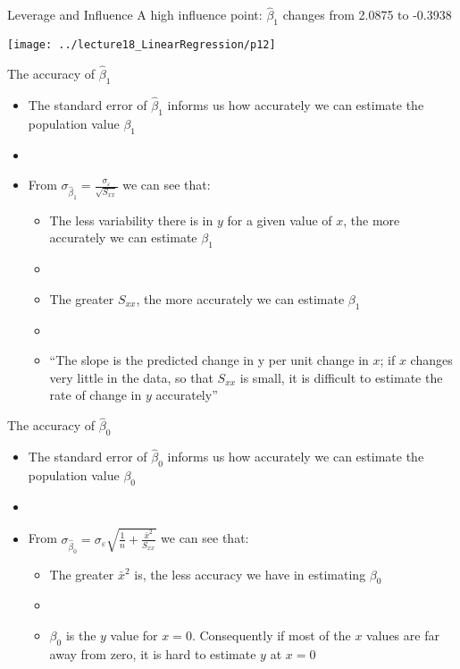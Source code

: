 \documentclass[xcolor=dvipsnames]{beamer}
\begin{document}
\begin{frame}{Leverage and Influence}
A high influence point: $\hat{\beta}_1$ changes from 2.0875 to -0.3938
\begin{center}
	\texttt{[image: ../lecture18\_LinearRegression/p12]}
\end{center}
\end{frame}

\begin{frame}{The accuracy of $\hat{\beta}_1$}
	\begin{itemize}
		\item The standard error of $\hat{\beta}_1$ informs us how accurately we can estimate the population value $\beta_1$
		\item[]
		\item From $\sigma_{\hat{\beta}_1} = \frac{\sigma_{\varepsilon}}{\sqrt{S_{xx}}}$ we can see that:
		\begin{itemize}
			\item The less variability there is in $y$ for a given value of $x$, the more accurately we can estimate $\beta_1$
			\item[]
			\item The greater $S_{xx}$, the more accurately we can estimate $\beta_1$
			\item[]
			\item ``The slope is the predicted change in y per unit change in $x$; if $x$ changes very little in the data, so that $S_{xx}$ is small, it is difficult to estimate the rate of change in $y$ accurately''
		\end{itemize}
	\end{itemize}
\end{frame}

\begin{frame}{The accuracy of $\hat{\beta}_0$}
	\begin{itemize}
		\item The standard error of $\hat{\beta}_0$ informs us how accurately we can estimate the population value $\beta_0$
		\item[]
		\item From $\sigma_{\hat{\beta}_0} = \sigma_{\varepsilon} \sqrt{\frac{1}{n}+\frac{\bar{x}^2}{S_{xx}}}$ we can see that:
		\begin{itemize}
			\item The greater $\bar{x}^2$ is, the less accuracy we have in estimating $\beta_0$
			\item[]
			\item $\beta_0$ is the $y$ value for $x = 0$. Consequently if most of the $x$ values are far away from zero, it is hard to estimate $y$ at $x = 0$
		\end{itemize}
	\end{itemize}
\end{frame}
\end{document}
